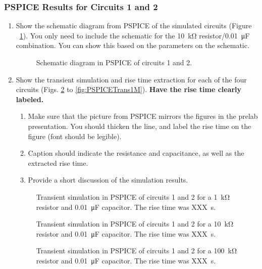 \documentclass[11pt]{article}
\begin{document}
\subsubsection{PSPICE Results for Circuits 1 and 2}
\begin{enumerate}
	\item	Show the schematic diagram from PSPICE of the simulated circuits (Figure ~\ref{fig:PSPICESchem}).  You only need to include the schematic for the 10~\si{\kilo\ohm} resistor/0.01~\si{\micro\farad} combination. You can show this based on the parameters on the schematic.
	\begin{figure}[h!]
		\vspace{2in}
		\caption{Schematic diagram in PSPICE of circuits 1 and 2.  }
		\label{fig:PSPICESchem}
	\end{figure}
	\item Show the transient simulation and rise time extraction for each of the four circuits (Figs. \ref{fig:PSPICETrans1k} to \ref{fig:PSPICETrans1M}).  \textbf{Have the rise time clearly labeled.}   
	\begin{enumerate}
		\item Make sure that the picture from PSPICE mirrors the figures in the prelab presentation.  You should thicken the line, and label the rise time on the figure (font should be legible).
		\item Caption should indicate the resistance and capacitance, as well as the extracted rise time.
		\item Provide a short discussion of the simulation results.
	\end{enumerate}
\begin{figure}[h!]
	\vspace{2in}
	\caption{Transient simulation in PSPICE of circuits 1 and 2 for a 1~\si{\kilo\ohm} resistor and 0.01~\si{\micro\farad} capacitor.  The rise time was XXX~\si{\s}.  }
	\label{fig:PSPICETrans1k}
\end{figure}
\begin{figure}[h!]
	\vspace{2in}
	\caption{Transient simulation in PSPICE of circuits 1 and 2 for a 10~\si{\kilo\ohm} resistor and 0.01~\si{\micro\farad} capacitor.  The rise time was XXX~\si{\s}.  }
	\label{fig:PSPICETrans10k}
\end{figure}
\begin{figure}[h!]
	\vspace{2in}
	\caption{Transient simulation in PSPICE of circuits 1 and 2 for a 100~\si{\kilo\ohm} resistor and 0.01~\si{\micro\farad} capacitor.  The rise time was XXX~\si{\s}.  }

\end{figure}
\end{enumerate}
\end{document}
